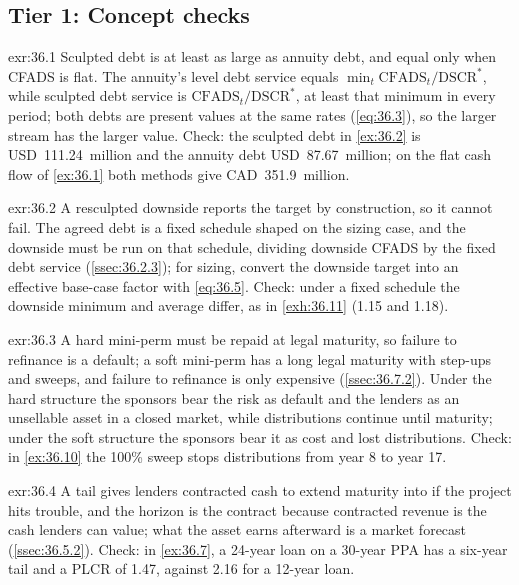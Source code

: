\subsection*{Tier 1: Concept checks}

\begin{solution}{exr:36.1}
Sculpted debt is at least as large as annuity debt, and equal only when CFADS is flat. The annuity's level debt service equals $\min_t \mathrm{CFADS}_t / \mathrm{DSCR}^{*}$, while sculpted debt service is $\mathrm{CFADS}_t/\mathrm{DSCR}^{*}$, at least that minimum in every period; both debts are present values at the same rates (\cref{eq:36.3}), so the larger stream has the larger value. Check: the sculpted debt in \cref{ex:36.2} is USD~111.24~million and the annuity debt USD~87.67~million; on the flat cash flow of \cref{ex:36.1} both methods give CAD~351.9~million.
\end{solution}

\begin{solution}{exr:36.2}
A resculpted downside reports the target by construction, so it cannot fail. The agreed debt is a fixed schedule shaped on the sizing case, and the downside must be run on that schedule, dividing downside CFADS by the fixed debt service (\cref{ssec:36.2.3}); for sizing, convert the downside target into an effective base-case factor with \cref{eq:36.5}. Check: under a fixed schedule the downside minimum and average differ, as in \cref{exh:36.11} (1.15\x{} and 1.18\x).
\end{solution}

\begin{solution}{exr:36.3}
A hard mini-perm must be repaid at legal maturity, so failure to refinance is a default; a soft mini-perm has a long legal maturity with step-ups and sweeps, and failure to refinance is only expensive (\cref{ssec:36.7.2}). Under the hard structure the sponsors bear the risk as default and the lenders as an unsellable asset in a closed market, while distributions continue until maturity; under the soft structure the sponsors bear it as cost and lost distributions. Check: in \cref{ex:36.10} the 100\% sweep stops distributions from year 8 to year 17.
\end{solution}

\begin{solution}{exr:36.4}
A tail gives lenders contracted cash to extend maturity into if the project hits trouble, and the horizon is the contract because contracted revenue is the cash lenders can value; what the asset earns afterward is a market forecast (\cref{ssec:36.5.2}). Check: in \cref{ex:36.7}, a 24-year loan on a 30-year PPA has a six-year tail and a PLCR of 1.47\x, against 2.16\x{} for a 12-year loan.
\end{solution}

